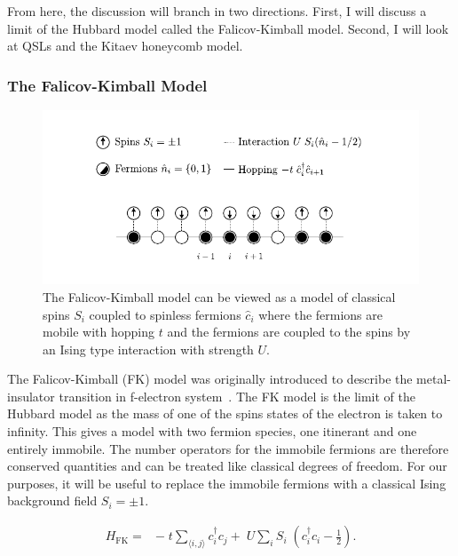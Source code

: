 From here, the discussion will branch in two directions. First, I will discuss a limit of the Hubbard model called the Falicov-Kimball model. Second, I will look at QSLs and the Kitaev honeycomb model.

\hypertarget{intro-the-fk-model}{%
\subsubsection{The Falicov-Kimball Model}\label{intro-the-fk-model}}

\hypertarget{fig:fk_schematic}{%
\begin{figure}
\centering
\includegraphics[width=1\textwidth,height=\textheight]{figure_code/intro_chapter/fk_schematic}
\caption[{Falicov-Kimball Model Diagram}]{The Falicov-Kimball model can be viewed as a model of classical spins \(S_i\) coupled to spinless fermions \(\hat{c}_i\) where the fermions are mobile with hopping \(t\) and the fermions are coupled to the spins by an Ising type interaction with strength \(U\).}
\label{fig:fk_schematic}
\end{figure}
}

The Falicov-Kimball (FK) model was originally introduced to describe the metal-insulator transition in f-electron system~\autocite{hubbardj.ElectronCorrelationsNarrow1963,falicovSimpleModelSemiconductorMetal1969}. The FK model is the limit of the Hubbard model as the mass of one of the spins states of the electron is taken to infinity. This gives a model with two fermion species, one itinerant and one entirely immobile. The number operators for the immobile fermions are therefore conserved quantities and can be treated like classical degrees of freedom. For our purposes, it will be useful to replace the immobile fermions with a classical Ising background field \(S_i = \pm1\).

\[\begin{aligned}
H_{\mathrm{FK}} = & -\;t \sum_{\langle i,j \rangle} c^\dagger_{i}c_{j} + \;U \sum_{i} S_i\;(c^\dagger_{i}c_{i} - \tfrac{1}{2}). \\ 
\end{aligned}\]

